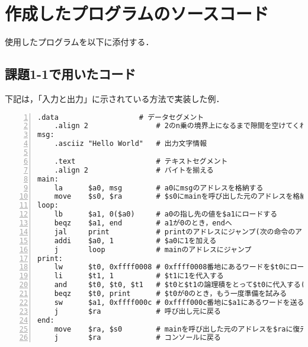 \section{作成したプログラムのソースコード} \label{sec:makep}

使用したプログラムを以下に添付する．



\subsection{課題1-1で用いたコード} \label{sec:p1-1}
下記は，「入力と出力」に示されている方法で実装した例．
\begin{Verbatim}[numbers=left, xleftmargin=10mm, numbersep=6pt,
                    fontsize=\small, baselinestretch=0.8]
    .data                   # データセグメント
    .align 2                # 2のn乗の境界上になるまで隙間を空けてくれる
msg:
    .asciiz "Hello World"   # 出力文字情報

    .text                   # テキストセグメント
    .align 2                # バイトを揃える
main:
    la      $a0, msg        # a0にmsgのアドレスを格納する
    move    $s0, $ra        # $s0にmainを呼び出した元のアドレスを格納
loop:
    lb      $a1, 0($a0)     # a0の指し先の値を$a1にロードする
    beqz    $a1, end        # a1が0のとき，endへ
    jal     print           # printのアドレスにジャンプ(次の命令のアドレスを$raに)
    addi    $a0, 1          # $a0に1を加える
    j       loop            # mainのアドレスにジャンプ
print:
    lw      $t0, 0xffff0008 # 0xffff0008番地にあるワードを$t0にロードする
    li      $t1, 1          # $t1に1を代入する
    and     $t0, $t0, $t1   # $t0と$t1の論理積をとって$t0に代入する($t0が1か確認する)
    beqz    $t0, print      # $t0が0のとき，もう一度準備を試みる
    sw      $a1, 0xffff000c # 0xffff000c番地に$a1にあるワードを送る
    j       $ra             # 呼び出し元に戻る
end:
    move    $ra, $s0        # mainを呼び出した元のアドレスを$raに復元
    j       $ra             # コンソールに戻る
\end{Verbatim}

